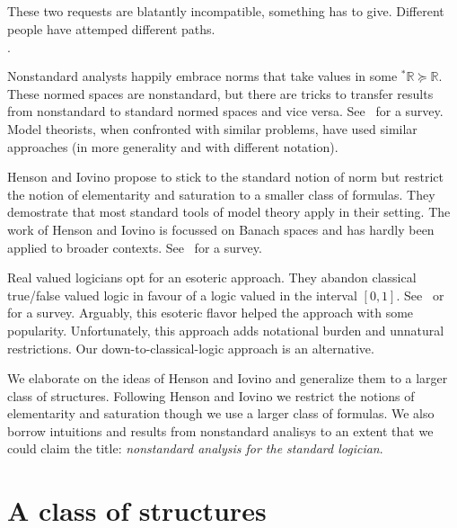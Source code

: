 \documentclass[10pt,oneside]{amsproc}
\newcommand{\mylabel}[1]{{#1}\hfill}
\renewenvironment{itemize}
  {\begin{list}{$\cdot$}{%
  \setlength{\parskip}{0mm}
  \setlength{\topsep}{.4\baselineskip}
  \setlength{\rightmargin}{0mm}
  \setlength{\listparindent}{0mm}
  \setlength{\itemindent}{0mm}
  \setlength{\labelwidth}{3ex}
  \setlength{\itemsep}{.2\baselineskip}
  \setlength{\parsep}{.2\baselineskip}
  \setlength{\partopsep}{0mm}
  \setlength{\labelsep}{1ex}
  \setlength{\leftmargin}{\labelwidth+\labelsep}
  \let\makelabel\mylabel}}{%
\end{list}}
\begin{document}
These two requests are blatantly incompatible, something has to give.
Different people have attemped different paths.
\begin{itemize}
  \item[1.] Nonstandard analysts happily embrace norms that take values in some ${}^*\mathds{R}\succeq\mathds{R}$.
  These normed spaces are nonstandard, but there are tricks to transfer results from nonstandard to standard normed spaces and vice versa. See~\cite{G} for a survey.
  Model theorists, when confronted with similar problems, have used similar approaches (in more generality and with different notation).
  \item[2.] Henson and Iovino propose to stick to the standard notion of norm but restrict the notion of elementarity and saturation to a smaller class of formulas.
  They demostrate that most standard tools of model theory apply in their setting. 
  The work of Henson and Iovino is focussed on Banach spaces and has hardly been applied to broader contexts. See~\cite{HI} for a survey.
  \item[3.] Real valued logicians opt for an esoteric approach.
  They abandon classical true/false valued logic in favour of a logic valued in the interval $[0,1]$.
  See~\cite{K} or~\cite{H} for a survey.
  Arguably, this esoteric flavor helped the approach with some popularity. 
  Unfortunately, this approach adds notational burden and unnatural restrictions.
  Our down-to-classical-logic approach is an alternative.
\end{itemize}

We elaborate on the ideas of Henson and Iovino and generalize them to a larger class of structures.
Following Henson and Iovino we restrict the notions of elementarity and saturation though we use a larger class of formulas.
We also borrow intuitions and results from nonstandard analisys to an extent that we could claim the title: \textit{nonstandard analysis for the standard logician}.

\section{A class of structures}\label{uno}
\end{document}
